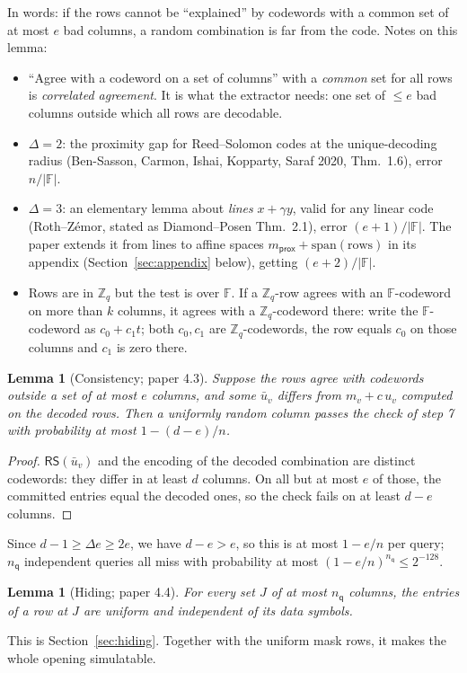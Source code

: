 \documentclass[11pt,a4paper]{article}
\newcommand{\Zq}{\mathbb{Z}_q}
\newcommand{\F}{\mathbb{F}}
\newcommand{\RS}{\mathsf{RS}}
\newcommand{\nq}{n_{\mathsf{q}}}
\theoremstyle{definition}
\theoremstyle{plain}
\newtheorem{lemma}[definition]{Lemma}
\begin{document}
In words: if the rows cannot be ``explained'' by codewords with a common set of at most $e$ bad columns,
a random combination is far from the code. Notes on this lemma:
\begin{itemize}[leftmargin=1.3em]
\item ``Agree with a codeword on a set of columns'' with a \emph{common} set for all rows is
  \emph{correlated agreement}. It is what the extractor needs: one set of $\le e$ bad columns outside
  which all rows are decodable.
\item $\Delta=2$: the proximity gap for Reed--Solomon codes at the unique-decoding radius
  (Ben-Sasson, Carmon, Ishai, Kopparty, Saraf 2020, Thm.~1.6), error $n/|\F|$.
\item $\Delta=3$: an elementary lemma about \emph{lines} $x+\gamma y$, valid for any linear code
  (Roth--Z\'emor, stated as Diamond--Posen Thm.~2.1), error $(e+1)/|\F|$. The paper extends it from lines
  to affine spaces $m_{\mathsf{prox}}+\mathrm{span}(\text{rows})$ in its appendix
  (Section~\ref{sec:appendix} below), getting $(e+2)/|\F|$.
\item Rows are in $\Zq$ but the test is over $\F$. If a $\Zq$-row agrees with an $\F$-codeword on more
  than $k$ columns, it agrees with a $\Zq$-codeword there: write the $\F$-codeword as $c_0+c_1t$; both
  $c_0,c_1$ are $\Zq$-codewords, the row equals $c_0$ on those columns and $c_1$ is zero there.
\end{itemize}

\begin{lemma}[Consistency; paper 4.3]\label{lem:cons}
Suppose the rows agree with codewords outside a set of at most $e$ columns, and some $\bar u_v$ differs
from $m_v+c\,u_v$ computed on the decoded rows. Then a uniformly random column passes the check of step 7
with probability at most $1-(d-e)/n$.
\end{lemma}
\begin{proof}
$\RS(\bar u_v)$ and the encoding of the decoded combination are distinct codewords: they differ in at
least $d$ columns. On all but at most $e$ of those, the committed entries equal the decoded ones, so the
check fails on at least $d-e$ columns.
\end{proof}
Since $d-1\ge\Delta e\ge 2e$, we have $d-e>e$, so this is at most $1-e/n$ per query; $\nq$ independent
queries all miss with probability at most $(1-e/n)^{\nq}\le 2^{-128}$.

\begin{lemma}[Hiding; paper 4.4]
For every set $J$ of at most $\nq$ columns, the entries of a row at $J$ are uniform and independent of
its data symbols.
\end{lemma}
This is Section~\ref{sec:hiding}. Together with the uniform mask rows, it makes the whole opening
simulatable.
\end{document}
